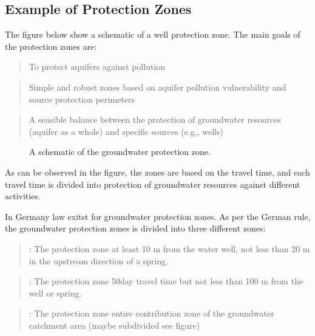 \documentclass[letterpaper,10pt,english]{jupyterBook}
\begin{document}
\subsection{Example of Protection Zones}
\label{\detokenize{content/flow/L6/16_darcy_law_3D:example-of-protection-zones}}
\sphinxAtStartPar
The figure below show a schematic of a well protection zone. The main goals of the protection zones are:
\begin{quote}

\sphinxAtStartPar
To protect aquifers against pollution
\end{quote}
\begin{quote}

\sphinxAtStartPar
Simple and robust zones based on aquifer pollution vulnerability and source protection perimeters
\end{quote}
\begin{quote}

\sphinxAtStartPar
A sensible balance between the protection of groundwater resources (aquifer as a whole) and specific sources (e.g., wells)
\end{quote}

\begin{figure}[htbp]
\centering
\capstart

\noindent{}
\caption{A schematic of the groundwater protection zone.}\label{\detokenize{content/flow/L6/16_darcy_law_3D:pzones}}\end{figure}

\sphinxAtStartPar
As can be observed in the figure, the zones are based on the travel time, and each travel time is divided into protection of groundwater resources against different activities.

\sphinxAtStartPar
In Germany law  exitst for groundwater protection zones. As per the German rule, the groundwater protection zones is divided into three different zones:
\begin{quote}

\sphinxAtStartPar
{} : The  protection zone \sphinxhyphen{} at least 10 m from the water well, not less than 20 m in the upstream direction of a spring.
\end{quote}
\begin{quote}

\sphinxAtStartPar
{} : The  protection zone \sphinxhyphen{} 50\sphinxhyphen{}day travel time but not less than 100 m from the well or spring.
\end{quote}
\begin{quote}

\sphinxAtStartPar
{} : The  protection zone \sphinxhyphen{} entire contribution zone of the groundwater catchment area (maybe sub\sphinxhyphen{}divided see figure)
\end{quote}
\end{document}
